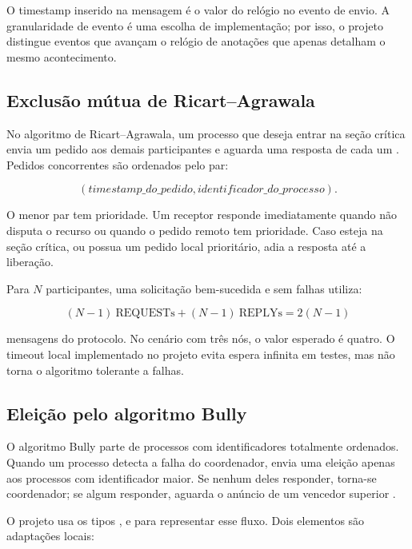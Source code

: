 O timestamp inserido na mensagem é o valor do relógio no evento de envio. A granularidade de evento é uma escolha de implementação; por isso, o projeto distingue eventos que avançam o relógio de anotações que apenas detalham o mesmo acontecimento.

\subsection{Exclusão mútua de Ricart--Agrawala}

No algoritmo de Ricart--Agrawala, um processo que deseja entrar na seção crítica envia um pedido aos demais participantes e aguarda uma resposta de cada um \cite{ricart1981}. Pedidos concorrentes são ordenados pelo par:

\begin{equation}
    (timestamp\_do\_pedido, identificador\_do\_processo).
\end{equation}

O menor par tem prioridade. Um receptor responde imediatamente quando não disputa o recurso ou quando o pedido remoto tem prioridade. Caso esteja na seção crítica, ou possua um pedido local prioritário, adia a resposta até a liberação.

Para $N$ participantes, uma solicitação bem-sucedida e sem falhas utiliza:

\begin{equation}
    (N-1)\ \text{REQUESTs} + (N-1)\ \text{REPLYs} = 2(N-1)
    \label{eq:ra-messages}
\end{equation}

mensagens do protocolo. No cenário com três nós, o valor esperado é quatro. O timeout local implementado no projeto evita espera infinita em testes, mas não torna o algoritmo tolerante a falhas.

\subsection{Eleição pelo algoritmo Bully}

O algoritmo Bully parte de processos com identificadores totalmente ordenados. Quando um processo detecta a falha do coordenador, envia uma eleição apenas aos processos com identificador maior. Se nenhum deles responder, torna-se coordenador; se algum responder, aguarda o anúncio de um vencedor superior \cite{garcia1982}.

O projeto usa os tipos ,  e  para representar esse fluxo. Dois elementos são adaptações locais:

